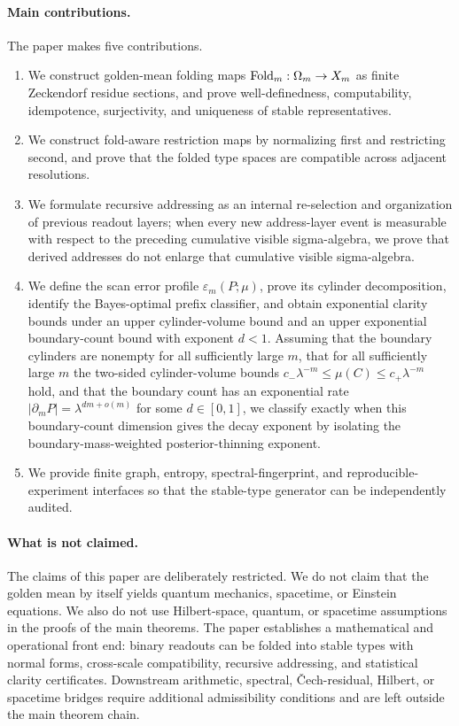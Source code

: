 \paragraph{Main contributions.}
The paper makes five contributions.
\begin{enumerate}[label=(\roman*)]
\item We construct golden-mean folding maps \(\operatorname{Fold}_m:\Omega_m\to X_m\) as finite Zeckendorf residue sections, and prove well-definedness, computability, idempotence, surjectivity, and uniqueness of stable representatives.
\item We construct fold-aware restriction maps by normalizing first and restricting second, and prove that the folded type spaces are compatible across adjacent resolutions.
\item We formulate recursive addressing as an internal re-selection and organization of previous readout layers; when every new address-layer event is measurable with respect to the preceding cumulative visible sigma-algebra, we prove that derived addresses do not enlarge that cumulative visible sigma-algebra.
\item We define the scan error profile \(\varepsilon_m(P;\mu)\), prove its cylinder decomposition, identify the Bayes-optimal prefix classifier, and obtain exponential clarity bounds under an upper cylinder-volume bound and an upper exponential boundary-count bound with exponent \(d<1\).  Assuming that the boundary cylinders are nonempty for all sufficiently large \(m\), that for all sufficiently large \(m\) the two-sided cylinder-volume bounds \(c_-\lambda^{-m}\le\mu(C)\le c_+\lambda^{-m}\) hold, and that the boundary count has an exponential rate \(\lvert\partial_mP\rvert=\lambda^{dm+o(m)}\) for some \(d\in[0,1]\), we classify exactly when this boundary-count dimension gives the decay exponent by isolating the boundary-mass-weighted posterior-thinning exponent.
\item We provide finite graph, entropy, spectral-fingerprint, and reproducible-experiment interfaces so that the stable-type generator can be independently audited.
\end{enumerate}

\paragraph{What is not claimed.}
The claims of this paper are deliberately restricted.  We do not claim that the golden mean by itself yields quantum mechanics, spacetime, or Einstein equations.  We also do not use Hilbert-space, quantum, or spacetime assumptions in the proofs of the main theorems.  The paper establishes a mathematical and operational front end: binary readouts can be folded into stable types with normal forms, cross-scale compatibility, recursive addressing, and statistical clarity certificates.  Downstream arithmetic, spectral, \v{C}ech-residual, Hilbert, or spacetime bridges require additional admissibility conditions and are left outside the main theorem chain.

